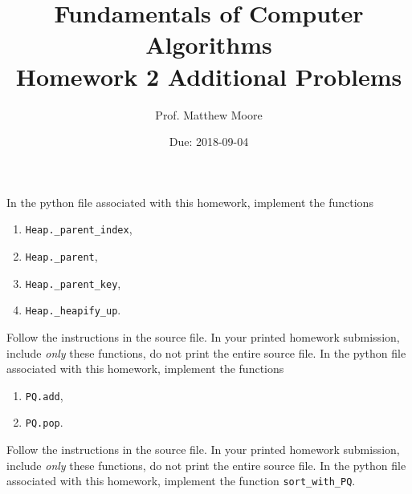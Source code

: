 \documentclass{exam} %
\theoremstyle{plain}
\theoremstyle{definition}
\theoremstyle{remark}
\numberwithin{equation}{section}  %
\begin{document}
  \title{Fundamentals of Computer Algorithms \\ Homework 2 Additional Problems}
  \author{Prof. Matthew Moore}
  \date{Due: 2018-09-04}
  \maketitle
  \begin{questions}
  \question In the python file associated with this homework, implement the
  functions
  \begin{enumerate}
    \item \verb|Heap._parent_index|,
    \item \verb|Heap._parent|,
    \item \verb|Heap._parent_key|,
    \item \verb|Heap._heapify_up|.
  \end{enumerate}
  Follow the instructions in the source file. In your printed homework
  submission, include \emph{only} these functions, do not print the entire
  source file.
  \question In the python file associated with this homework, implement the
  functions
  \begin{enumerate}
    \item \texttt{PQ.add},
    \item \texttt{PQ.pop}.
  \end{enumerate}
  Follow the instructions in the source file. In your printed homework
  submission, include \emph{only} these functions, do not print the entire
  source file.
  \question In the python file associated with this homework, implement the
  function \verb|sort_with_PQ|.
  
  \smallskip
  

\end{questions}
\end{document}
